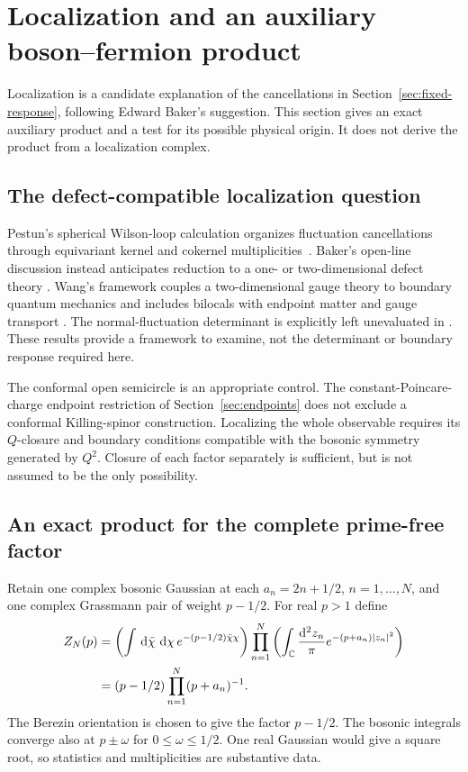 \section{Localization and an auxiliary boson--fermion product}
\label{sec:localization}

Localization is a candidate explanation of the cancellations
in Section~\ref{sec:fixed-response}, following Edward Baker's
suggestion. This section gives an exact auxiliary product
and a test for its possible physical origin. It does not
derive the product from a localization complex.

\subsection{The defect-compatible localization question}

Pestun's spherical Wilson-loop calculation organizes
fluctuation cancellations through equivariant kernel and
cokernel multiplicities~\cite[Section~4]{Pestun}.
Baker's open-line discussion instead anticipates reduction
to a one- or two-dimensional defect theory
\cite[Section~3.3]{Baker}. Wang's framework couples a
two-dimensional gauge theory to boundary quantum mechanics
and includes bilocals with endpoint matter and gauge
transport \cite[Section~5.1, equation~(5.5)]{WangDefects}.
The normal-fluctuation determinant is explicitly left
unevaluated in \cite[Section~4.4]{WangDefects}. These results
provide a framework to examine, not the determinant or
boundary response required here.

The conformal open semicircle is an appropriate control.
The constant-Poincare-charge endpoint restriction of
Section~\ref{sec:endpoints} does not exclude a conformal
Killing-spinor construction. Localizing the whole observable
requires its $Q$-closure and boundary conditions compatible
with the bosonic symmetry generated by $Q^2$. Closure of
each factor separately is sufficient, but is not assumed
to be the only possibility.

\subsection{An exact product for the complete prime-free factor}
\label{subsec:bf-product}

Retain one complex bosonic Gaussian at each
$a_n=2n+1/2$, $n=1,\ldots,N$, and one complex Grassmann pair
of weight $p-1/2$. For real $p>1$ define
\begin{align}\label{eq:bf-gaussian}
 Z_N(p)
 &=
 \left(\int\,\mathrm d\bar\chi\,\,\mathrm d\chi\,
 e^{-(p-1/2)\bar\chi\chi}\right)
 \prod_{n=1}^N\left(\int_\mathbb C\frac{\mathrm d^2z_n}{\pi}
 e^{-(p+a_n)|z_n|^2}\right)\notag\\
 &=(p-1/2)\prod_{n=1}^N(p+a_n)^{-1}.
\end{align}
The Berezin orientation is chosen to give the factor
$p-1/2$. The bosonic integrals converge also at
$p\pm\omega$ for $0\le\omega\le1/2$. One real Gaussian
would give a square root, so statistics and multiplicities
are substantive data.

